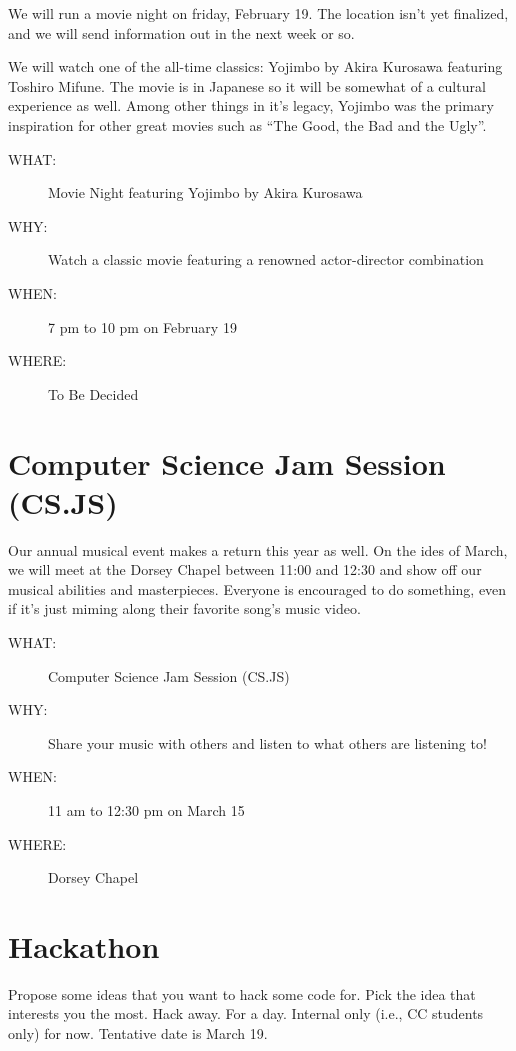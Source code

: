We will run a movie night on friday, February 19. The location isn't yet
finalized, and we will send information out in the next week or so.

We will watch one of the all-time classics: Yojimbo by Akira Kurosawa featuring
Toshiro Mifune. The movie is in Japanese so it will be somewhat of a cultural
experience as well. Among other things in it's legacy, Yojimbo was the primary
inspiration for other great movies such as \textquotedblleft{}The Good, the Bad and the
Ugly\textquotedblright{}.

\begin{description}
\item[{WHAT:}] Movie Night featuring Yojimbo by Akira Kurosawa
\item[{WHY:}] Watch a classic movie featuring a renowned actor-director combination
\item[{WHEN:}] 7 pm to 10 pm on February 19
\item[{WHERE:}] To Be Decided
\end{description}


\newpage


\section{Computer Science Jam Session (CS.JS)}
\label{sec-7}

Our annual musical event makes a return this year as well. On the ides of
March, we will meet at the Dorsey Chapel between 11:00 and 12:30 and show off
our musical abilities and masterpieces. Everyone is encouraged to do something,
even if it's just miming along their favorite song's music video.

\begin{description}
\item[{WHAT:}] Computer Science Jam Session (CS.JS)
\item[{WHY:}] Share your music with others and listen to what others are listening to!
\item[{WHEN:}] 11 am to 12:30 pm on March 15
\item[{WHERE:}] Dorsey Chapel
\end{description}


\newpage


\section{Hackathon}
\label{sec-8}

Propose some ideas that you want to hack some code for. Pick the idea that
interests you the most. Hack away. For a day. Internal only (i.e., CC students
only) for now. Tentative date is March 19.

